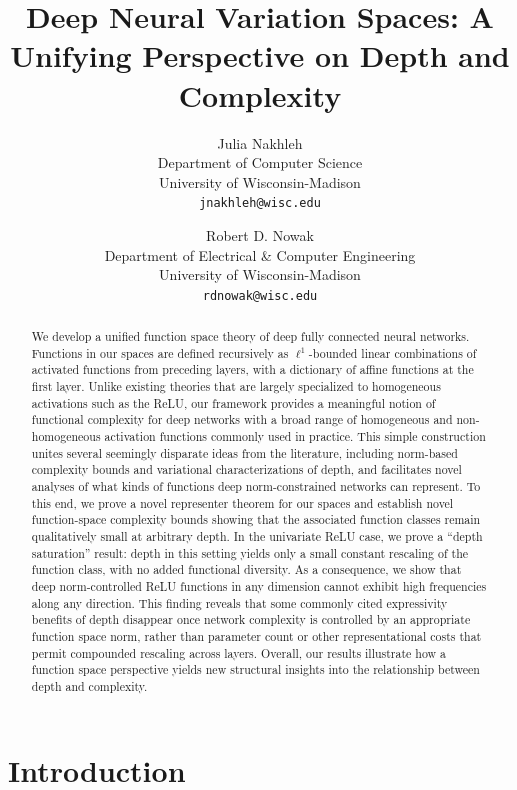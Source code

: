 \documentclass{article}
\title{\bf Deep Neural Variation Spaces: A Unifying Perspective on Depth and Complexity}
\author{%
  Julia Nakhleh \\
  Department of Computer Science\\
  University of Wisconsin-Madison\\
  \texttt{jnakhleh@wisc.edu} \\
  \and
  Robert D. Nowak \\
  Department of Electrical \& Computer Engineering \\
  University of Wisconsin-Madison\\
  \texttt{rdnowak@wisc.edu}
}
\date{}
\begin{document}
\maketitle
\begin{abstract}
    We develop a unified function space theory of deep fully connected neural networks. Functions in our spaces are defined recursively as $\ell^1$-bounded linear combinations of activated functions from preceding layers, with a dictionary of affine functions at the first layer. Unlike existing theories that are largely specialized to homogeneous activations such as the ReLU, our framework provides a meaningful notion of functional complexity for deep networks with a broad range of homogeneous and non-homogeneous activation functions commonly used in practice. This simple construction unites several seemingly disparate ideas from the literature, including norm-based complexity bounds and variational characterizations of depth, and facilitates novel analyses of what kinds of functions deep norm-constrained networks can represent. To this end, we prove a novel representer theorem for our spaces and establish novel function-space complexity bounds showing that the associated function classes remain qualitatively small at arbitrary depth. In the univariate ReLU case, we prove a “depth saturation” result: depth in this setting yields only a small constant rescaling of the function class, with no added functional diversity. As a consequence, we show that deep norm-controlled ReLU functions in any dimension cannot exhibit high frequencies along any direction. This finding reveals that some commonly cited expressivity benefits of depth disappear once network complexity is controlled by an appropriate function space norm, rather than parameter count or other representational costs that permit compounded rescaling across layers. Overall, our results illustrate how a function space perspective yields new structural insights into the relationship between depth and complexity.
\end{abstract}

\section{Introduction}
\end{document}
